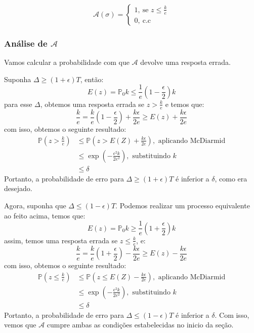 \[
   \mathcal{A}(\sigma) = \begin{cases} 
                    1,\ \text{se }z \leq \frac{k}{e}\\ 
                    0,\ \text{c.c}\end{cases}
\]

\subsubsection{Análise de $\mathcal{A}$}
Vamos calcular a probabilidade com que $\mathcal{A}$ devolve uma resposta errada.


Suponha $\Delta \geq \left(1+\epsilon\right)T$, então:
\begin{equation*}
E(z) = \mathbb{P}_0 k \leq \frac{1}{e}\left(1-\frac{\epsilon}{2}\right)k    
\end{equation*}
para esse $\Delta$, obtemos uma resposta errada se $z > \frac{k}{e}$ e temos que:
\begin{equation*}
\frac{k}{e} = \frac{k}{e}\left(1-\frac{\epsilon}{2}\right) + \frac{k\epsilon}{2e} \geq E(z) + \frac{k\epsilon}{2e}    
\end{equation*}
com isso, obtemos o seguinte resultado:
\begin{align*}
    \mathbb{P}\left(z>\frac{k}{e}\right) &\leq \mathbb{P}\left(z > E(Z)+\frac{k\epsilon}{2e}\right),\text{ aplicando McDiarmid}\\
    &\leq \exp\left(-\frac{\epsilon^2k}{2e^2}\right), \text{ substituindo $k$}\\
    &\leq \delta        
\end{align*}    
Portanto, a probabilidade de erro para $\Delta \geq \left(1+\epsilon\right)T$ é inferior a $\delta$, como era desejado.

Agora, suponha que $\Delta \leq (1-\epsilon)T$. Podemos realizar um processo equivalente ao feito acima, temos que:
\begin{equation*}
E(z) = \mathbb{P}_0 k \geq \frac{1}{e}\left(1+\frac{\epsilon}{2}\right)k    
\end{equation*}
assim, temos uma resposta errada se $z \leq \frac{k}{e}$, e:
\begin{equation*}
\frac{k}{e} = \frac{k}{e}\left(1+\frac{\epsilon}{2}\right) - \frac{k\epsilon}{2e} \geq E(z) - \frac{k\epsilon}{2e}    
\end{equation*}
com isso, obtemos o seguinte resultado:
\begin{align*}
    \mathbb{P}\left(z \leq \frac{k}{e}\right) &\leq \mathbb{P}\left( z \leq E(Z) - \frac{k\epsilon}{2e}\right),\text{ aplicando McDiarmid}\\
    &\leq \exp\left(-\frac{\epsilon^2k}{2e^2}\right), \text{ substituindo $k$}\\
    &\leq \delta        
\end{align*}
Portanto, a probabilidade de erro para $\Delta \leq (1-\epsilon)T$ é inferior a $\delta$. Com isso, vemos que $\mathcal{A}$ cumpre ambas as condições estabelecidas no inicio da seção.



